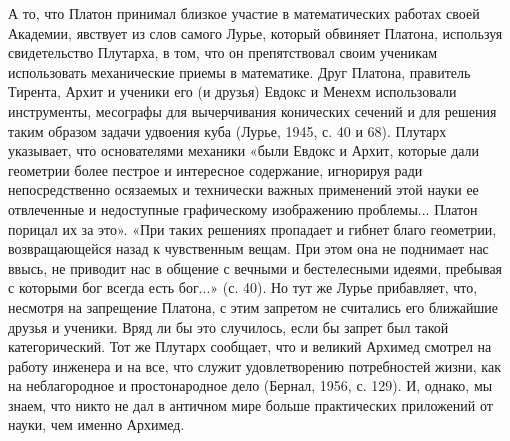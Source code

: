 А то,  что Платон  принимал близкое  участие в  математических работах
своей  Академии,  явствует  из  слов самого  Лурье,  который  обвиняет
Платона, используя свидетельство Плутарха, в том, что он препятствовал
своим  ученикам использовать  механические приемы  в математике.  Друг
Платона, правитель  Тирента, Архит и  ученики его (и друзья)  Евдокс и
Менехм использовали инструменты, месографы для вычерчивания конических
сечений и для решения таким образом задачи удвоения куба (Лурье, 1945,
с.  40  и 68).  Плутарх  указывает,  что основателями  механики  «были
Евдокс  и Архит,  которые дали  геометрии более  пестрое и  интересное
содержание,  игнорируя  ради  непосредственно осязаемых  и  технически
важных применений этой науки ее отвлеченные и недоступные графическому
изображению проблемы... Платон порицал их за это». «При таких решениях
пропадает и гибнет благо геометрии, возвращающейся назад к чувственным
вещам. При этом она не поднимает  нас ввысь, не приводит нас в общение
с вечными и  бестелесными идеями, пребывая с которыми  бог всегда есть
бог...»  (с.  40).  Но  тут  же Лурье  прибавляет,  что,  несмотря  на
запрещение Платона, с этим запретом  не считались его ближайшие друзья
и  ученики.  Вряд ли  бы  это  случилось,  если  бы запрет  был  такой
категорический. Тот же Плутарх сообщает, что и великий Архимед смотрел
на работу  инженера и на  все, что служит  удовлетворению потребностей
жизни, как  на неблагородное и  простонародное дело (Бернал,  1956, с.
129). И,  однако, мы знаем,  что никто не  дал в античном  мире больше
практических приложений от науки, чем именно Архимед.

